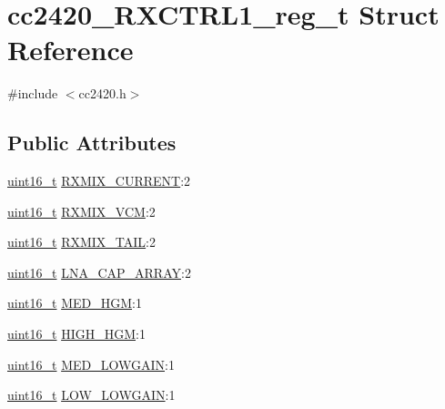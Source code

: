 \hypertarget{structcc2420___r_x_c_t_r_l1__reg__t}{}\section{cc2420\+\_\+\+R\+X\+C\+T\+R\+L1\+\_\+reg\+\_\+t Struct Reference}
\label{structcc2420___r_x_c_t_r_l1__reg__t}


{\ttfamily \#include $<$cc2420.\+h$>$}

\subsection*{Public Attributes}
\begin{DoxyCompactItemize}
\item 
\hyperlink{_p_e___types_8h_a1f1825b69244eb3ad2c7165ddc99c956}{uint16\+\_\+t} \hyperlink{structcc2420___r_x_c_t_r_l1__reg__t_a37ca9926d4c1692c024be505eedab837}{R\+X\+M\+I\+X\+\_\+\+C\+U\+R\+R\+E\+NT}\+:2
\item 
\hyperlink{_p_e___types_8h_a1f1825b69244eb3ad2c7165ddc99c956}{uint16\+\_\+t} \hyperlink{structcc2420___r_x_c_t_r_l1__reg__t_abd0b1d293bd289a680279ba4a4e59850}{R\+X\+M\+I\+X\+\_\+\+V\+CM}\+:2
\item 
\hyperlink{_p_e___types_8h_a1f1825b69244eb3ad2c7165ddc99c956}{uint16\+\_\+t} \hyperlink{structcc2420___r_x_c_t_r_l1__reg__t_a3568290db97bfb5a25ca98f39208bf2a}{R\+X\+M\+I\+X\+\_\+\+T\+A\+IL}\+:2
\item 
\hyperlink{_p_e___types_8h_a1f1825b69244eb3ad2c7165ddc99c956}{uint16\+\_\+t} \hyperlink{structcc2420___r_x_c_t_r_l1__reg__t_a64dc2e933b1547e75f317b772661c30d}{L\+N\+A\+\_\+\+C\+A\+P\+\_\+\+A\+R\+R\+AY}\+:2
\item 
\hyperlink{_p_e___types_8h_a1f1825b69244eb3ad2c7165ddc99c956}{uint16\+\_\+t} \hyperlink{structcc2420___r_x_c_t_r_l1__reg__t_a1c994760e1176d38c81e0902f64316bd}{M\+E\+D\+\_\+\+H\+GM}\+:1
\item 
\hyperlink{_p_e___types_8h_a1f1825b69244eb3ad2c7165ddc99c956}{uint16\+\_\+t} \hyperlink{structcc2420___r_x_c_t_r_l1__reg__t_a084dd26f259d235bda7c0b9eec652c5e}{H\+I\+G\+H\+\_\+\+H\+GM}\+:1
\item 
\hyperlink{_p_e___types_8h_a1f1825b69244eb3ad2c7165ddc99c956}{uint16\+\_\+t} \hyperlink{structcc2420___r_x_c_t_r_l1__reg__t_a23e3120daaaa36b358a014c1d8cbed8a}{M\+E\+D\+\_\+\+L\+O\+W\+G\+A\+IN}\+:1
\item 
\hyperlink{_p_e___types_8h_a1f1825b69244eb3ad2c7165ddc99c956}{uint16\+\_\+t} \hyperlink{structcc2420___r_x_c_t_r_l1__reg__t_ac35e306aaf6fc174c9bc84f0fc39d5f4}{L\+O\+W\+\_\+\+L\+O\+W\+G\+A\+IN}\+:1

\end{DoxyCompactItemize}
